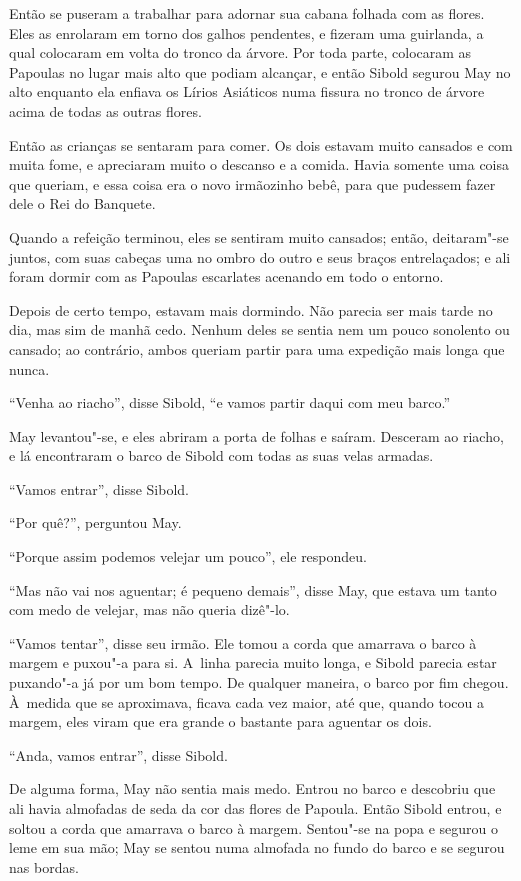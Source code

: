 Então se puseram a trabalhar para adornar sua cabana folhada com as
flores. Eles as enrolaram em torno dos galhos pendentes, e fizeram uma
guirlanda, a qual colocaram em volta do tronco da árvore. Por toda parte,
colocaram as Papoulas no lugar mais alto que podiam alcançar, e então
Sibold segurou May no alto enquanto ela enfiava os Lírios Asiáticos numa
fissura no tronco de árvore acima de todas as outras flores.

Então as crianças se sentaram para comer. Os dois estavam muito cansados
e com muita fome, e apreciaram muito o descanso e a comida. Havia
somente uma coisa que queriam, e essa coisa era o novo irmãozinho
bebê, para que pudessem fazer dele o Rei do Banquete.

Quando a refeição terminou, eles se sentiram muito cansados; então,
deitaram"-se juntos, com suas cabeças uma no ombro do outro e seus braços
entrelaçados; e ali foram dormir com as Papoulas escarlates
acenando em todo o entorno.

\smallskip

Depois de certo tempo, estavam mais dormindo. Não parecia ser
mais tarde no dia, mas sim de manhã cedo. Nenhum deles se sentia nem um pouco
sonolento ou cansado; ao contrário, ambos queriam partir para uma
expedição mais longa que nunca.

``Venha ao riacho'', disse Sibold, ``e vamos partir daqui com meu barco.''

May levantou"-se, e eles abriram a porta de folhas e saíram. Desceram ao
riacho, e lá encontraram o barco de Sibold com todas as suas velas
armadas.

``Vamos entrar'', disse Sibold.

``Por quê?'', perguntou May.

``Porque assim podemos velejar um pouco'', ele respondeu.

``Mas não vai nos aguentar; é pequeno demais'', disse May, que
estava um tanto com medo de velejar, mas não queria dizê"-lo.

``Vamos tentar'', disse seu irmão. Ele tomou a corda que amarrava o
barco à margem e puxou"-a para si. A~linha parecia muito longa, e Sibold
parecia estar puxando"-a já por um bom tempo. De qualquer maneira, o
barco por fim chegou. À~medida que se aproximava, ficava cada vez maior,
até que, quando tocou a margem, eles viram que era grande o bastante
para aguentar os dois.

``Anda, vamos entrar'', disse Sibold.

De alguma forma, May não sentia mais medo. Entrou no barco e descobriu
que ali havia almofadas de seda da cor das flores de Papoula. Então
Sibold entrou, e soltou a corda que amarrava o barco à margem. Sentou"-se
na popa e segurou o leme em sua mão; May se sentou numa almofada no
fundo do barco e se segurou nas bordas.

